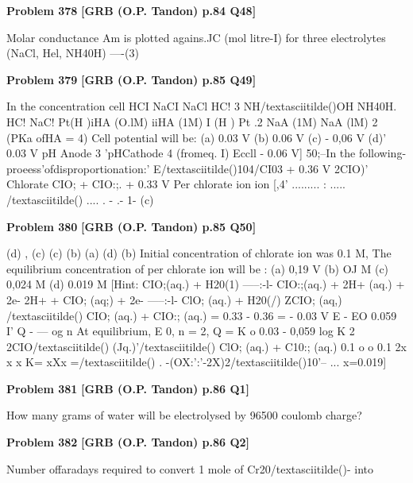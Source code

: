 \begin{problembox}
\textbf{Problem 378} \hfill \textbf{[GRB (O.P. Tandon) p.84 Q48]}
\label{q:ext-grb_all_questions-378}

Molar conductance Am is plotted agains.JC (mol litre-I) for 
three electrolytes (NaCl, Hel, NH40H) 
----(3)
\end{problembox}

\begin{problembox}
\textbf{Problem 379} \hfill \textbf{[GRB (O.P. Tandon) p.85 Q49]}
\label{q:ext-grb_all_questions-379}

In the concentration cell 
HCI 
NaCI 
NaCl 
HC! 
3 
NH/textasciitilde()OH 
NH40H. 
HC! 
NaC! 
Pt(H )iHA (O.lM) iiHA (1M) I 
(H ) Pt 
.2 
NaA (1M) 
NaA (lM) 
2 
(PKa ofHA = 4) 
Cell potential will be: 
(a) 0.03 V 
(b) 0.06 V 
(c) - 0,06 V 
(d)' 0.03 V 
pH Anode 
3 
'pHCathode 
4 (fromeq. I) 
Eccll 
- 0.06 V] 
50;--In the following-proeess'ofdisproportionation:' 
E/textasciitilde()104/CI03 + 0.36 V 
2CIO)' 
Chlorate 
CIO; + CIO:;. 
+ 0.33 V 
Per chlorate 
ion 
ion 
[,4' ......... 
: ..... /textasciitilde() 
.... 
. 
-
.-
1- (c)
\end{problembox}

\begin{problembox}
\textbf{Problem 380} \hfill \textbf{[GRB (O.P. Tandon) p.85 Q50]}
\label{q:ext-grb_all_questions-380}

(d) , 
(c) 
(c) 
(b) 
(a) 
(d) 
(b) 
Initial concentration of chlorate ion was 0.1 M, The 
equilibrium concentration of per chlorate ion will be : 
(a) 0,19 V 
(b) OJ M 
(c) 0,024 M 
(d) 0.019 M 
[Hint: 
CIO;(aq.) + H20(1) -----:-l- CIO:;(aq.) + 2H+ (aq.) + 2e-
2H+ + CIO; (aq;) + 2e- -----:-l- ClO; (aq.) + H20(/) 
ZCIO; (aq,) /textasciitilde() 
CIO; (aq.) + CIO:; (aq.) 
= 0.33 - 0.36 = - 0.03 V 
E - EO 
0.059 I' Q 
-
--- og 
n 
At equilibrium, 
E 
0, 
n = 2, Q = K 
o 
0.03 - 0,059 log K 
2 
2CIO/textasciitilde() (Jq.)'/textasciitilde() ClO; (aq.) + C10:; (aq.) 
0.1 
o 
o 
0.1 
2x 
x 
x 
K= 
xXx 
=/textasciitilde() 
. 
-(OX:':'-2X)2/textasciitilde()10'--
... 
x=0.019]
\end{problembox}

\begin{problembox}
\textbf{Problem 381} \hfill \textbf{[GRB (O.P. Tandon) p.86 Q1]}
\label{q:ext-grb_all_questions-381}

How many grams of water will be electrolysed by 96500 
coulomb charge?
\end{problembox}

\begin{problembox}
\textbf{Problem 382} \hfill \textbf{[GRB (O.P. Tandon) p.86 Q2]}
\label{q:ext-grb_all_questions-382}

Number offaradays required to convert 1 mole of Cr20/textasciitilde()- into
\end{problembox}

